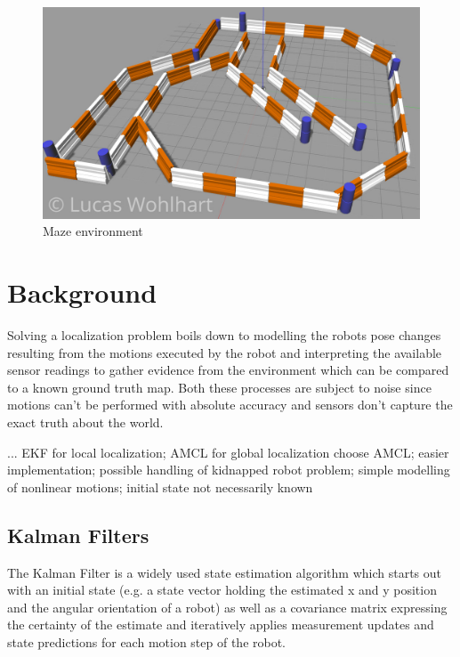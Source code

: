 \documentclass[10pt,journal,compsoc]{IEEEtran}
\begin{document}
\begin{figure}[thpb]
      \centering
      \includegraphics[width=\linewidth]{maze_world}
      \caption{Maze environment}
      \label{fig:maze}
\end{figure}





\section{Background}
Solving a localization problem boils down to modelling the robots pose changes resulting from the motions executed by the robot and interpreting the available sensor readings to gather evidence from the environment which can be compared to a known ground truth map.
Both these processes are subject to noise since motions can't be performed with absolute accuracy and sensors don't capture the exact truth about the world.

... EKF for local localization;
AMCL for global localization
choose AMCL; easier implementation; possible handling of kidnapped robot problem; simple modelling of nonlinear motions; initial state not necessarily known


\subsection{Kalman Filters}
The Kalman Filter is a widely used state estimation algorithm which starts out with an initial state (e.g. a state vector holding the estimated x and y position and the angular orientation of a robot) as well as a covariance matrix expressing the certainty of the estimate and iteratively applies measurement updates and state predictions for each motion step of the robot.
\end{document}
